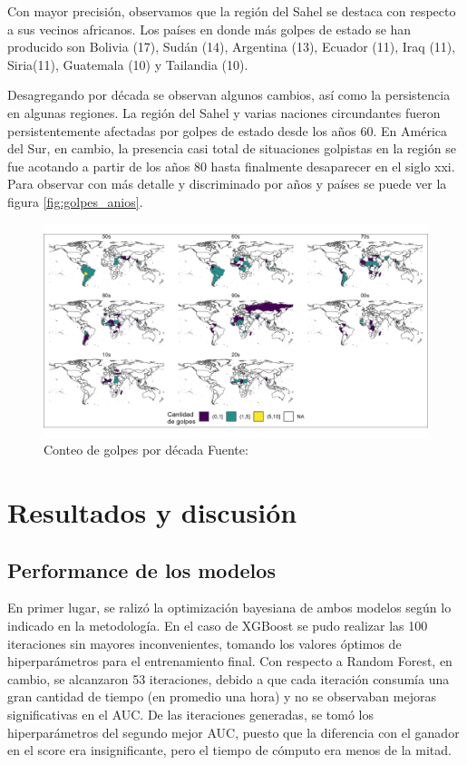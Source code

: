 \documentclass{article}
\begin{document}
Con mayor precisión, observamos que la región del Sahel se destaca con respecto a sus
vecinos africanos. Los países en donde más golpes de estado se han producido son
Bolivia (17), Sudán (14), Argentina (13), Ecuador (11), Iraq (11), Siria(11), 
Guatemala (10) y Tailandia (10).

Desagregando por década se observan algunos cambios, así como la persistencia en 
algunas regiones. La región del Sahel y varias naciones circundantes fueron 
persistentemente afectadas por golpes de estado desde los años 60. En América del 
Sur, en cambio, la presencia casi total de situaciones golpistas en la región se 
fue acotando a partir de los años 80 hasta finalmente desaparecer en el siglo 
xxi. Para observar con más detalle y discriminado por años y países se puede ver 
la figura \ref{fig:golpes_anios}.

\begin{figure}[H]
  \centering  
  \includegraphics[width=1\textwidth]{3_golpes_decadas.png}
  \caption{Conteo de golpes por década Fuente:\cite{Pow11} \label{fig:golpes_decadas}}
\end{figure}

\section{Resultados y discusión}

\subsection{Performance de los modelos}
En primer lugar, se ralizó la optimización bayesiana de ambos modelos según lo indicado
en la metodología. En el caso de XGBoost se pudo realizar las 100 iteraciones sin mayores
inconvenientes, tomando los valores óptimos de hiperparámetros para el entrenamiento 
final. Con respecto a Random Forest, en cambio, se alcanzaron 53 iteraciones, debido a que cada
iteración consumía una gran cantidad de tiempo (en promedio una hora) y no se observaban
mejoras significativas en el AUC. De las iteraciones generadas, se tomó los 
hiperparámetros del segundo mejor AUC, puesto que la diferencia con el ganador en el score 
era insignificante, pero el tiempo de cómputo era menos de la mitad.
\end{document}
